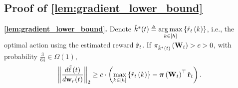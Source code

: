\subsection{Proof of \cref{lem:gradient_lower_bound}}

{\bf \cref{lem:gradient_lower_bound}.} Denote $\hat{k}^*(t) \triangleq \operatorname*{arg\,max}\limits_{k \in [h]}\left\{ \hat{r}_{t}\left(k\right) \right\}$, i.e., the optimal action using the estimated reward $ \hat{{\mathbf{r}}}_t$. If $\pi_{\hat{k}^*(t)}\left({\mathbf{W}}_t\right) > c > 0$, with probability $\frac{3}{64} \in \Omega\left( 1 \right)$,
\begin{equation*}
\begin{split}
	\left\| \frac{d\tilde{\ell}\left(t\right)}{d {\mathbf{w}}_r(t)} \right\|_2 \ge c \cdot \left( \max\limits_{k \in \left[h\right]}\left\{ \hat{r}_t\left(k\right) \right\} - {\boldsymbol{\pi}}\left( {\mathbf{W}}_t \right)^\top \hat{{\mathbf{r}}}_t \right) .
\end{split}
\end{equation*}
